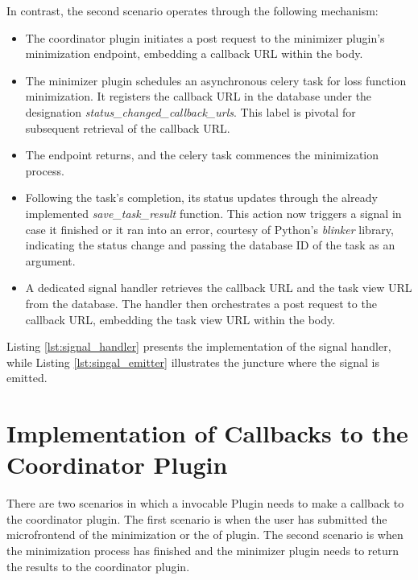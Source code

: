 \documentclass[
  a4paper,  %
  twoside,  %
  bibliography=totoc,
  headsepline,
  cleardoublepage=empty,
  parskip=half,
  draft=false
]{scrbook}
\begin{document}
In contrast, the second scenario operates through the following mechanism:
\begin{itemize}
    \item The coordinator plugin initiates a post request to the minimizer plugin's minimization endpoint, embedding a callback URL within the body.
    \item The minimizer plugin schedules an asynchronous celery task for loss function minimization.
    It registers the callback URL in the database under the designation \emph{status\_changed\_callback\_urls}.
    This label is pivotal for subsequent retrieval of the callback URL.
    \item The endpoint returns, and the celery task commences the minimization process.
    \item Following the task's completion, its status updates through the already implemented \emph{save\_task\_result} function.
    This action now triggers a signal in case it finished or it ran into an error, courtesy of Python's \emph{blinker} library, indicating the status change and passing the database ID of the task as an argument.
    \item A dedicated signal handler retrieves the callback URL and the task view URL from the database.
    The handler then orchestrates a post request to the callback URL, embedding the task view URL within the body.
\end{itemize}

Listing \ref{lst:signal_handler} presents the implementation of the signal handler, while Listing \ref{lst:singal_emitter} illustrates the juncture where the signal is emitted.




\section{Implementation of Callbacks to the Coordinator Plugin}
\label{sec:implementationOfCallbacksToTheCoordinatorPlugin}
There are two scenarios in which a invocable Plugin needs to make a callback to the coordinator plugin.
The first scenario is when the user has submitted the microfrontend of the minimization or the \gls{of} plugin.
The second scenario is when the minimization process has finished and the minimizer plugin needs to return the results to the coordinator plugin.
\end{document}
